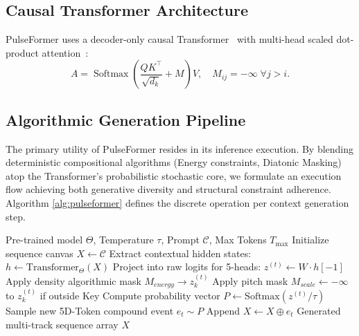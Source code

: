 \documentclass[conference]{IEEEtran}
\begin{document}
\subsection{Causal Transformer Architecture}
PulseFormer uses a decoder-only causal Transformer~\cite{vaswani2017attention} with multi-head scaled dot-product attention~\cite{dao2022flashattention}:
\begin{equation}
A = \operatorname{Softmax}\!\left(\frac{QK^\top}{\sqrt{d_k}} + M\right)V, \quad M_{ij}=-\infty\;\forall j>i.
\end{equation}

\subsection{Algorithmic Generation Pipeline}
The primary utility of PulseFormer resides in its inference execution. By blending deterministic compositional algorithms (Energy constraints, Diatonic Masking) atop the Transformer's probabilistic stochastic core, we formulate an execution flow achieving both generative diversity and structural constraint adherence. Algorithm \ref{alg:pulseformer} defines the discrete operation per context generation step.

\begin{algorithm}[htbp]
\caption{PulseFormer Steerable Multi-Track Inference}
\label{alg:pulseformer}
\begin{algorithmic}[1]
\REQUIRE Pre-trained model $\Theta$, Temperature $\tau$, Prompt $\mathcal{C}$, Max Tokens $T_{\max}$
\STATE Initialize sequence canvas $X \leftarrow \mathcal{C}$
    \STATE Extract contextual hidden states: $h \leftarrow \text{Transformer}_\Theta(X)$
    \STATE Project into raw logits for 5-heads: $z^{(t)} \leftarrow W \cdot h[-1]$
            \STATE Apply density algorithmic mask $M_{energy} \to z_k^{(t)}$
        \ENDIF
            \STATE Apply pitch mask $M_{scale} \leftarrow -\infty$ to $z_k^{(t)}$ if outside Key
        \ENDIF
    \ENDFOR
    \STATE Compute probability vector $P \leftarrow \text{Softmax}(z^{(t)} / \tau)$
    \STATE Sample new 5D-Token compound event $e_t \sim P$
    \STATE Append $X \leftarrow X \oplus e_t$
\ENDFOR
\RETURN Generated multi-track sequence array $X$
\end{algorithmic}
\end{algorithm}
\end{document}
